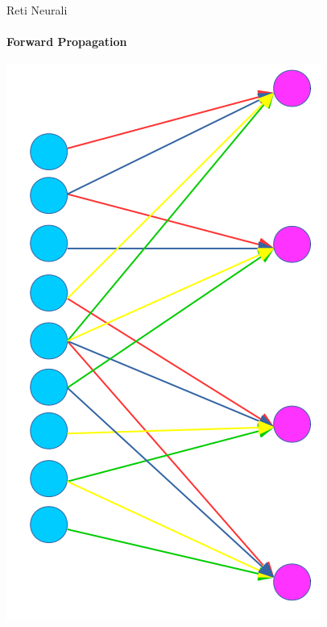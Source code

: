 \documentclass[
 ]{beamer}
\begin{document}
\begin{frame}{Reti Neurali}
    \framesubtitle{Forward Propagation} 
    
    \begin{center}
      \includegraphics[scale = 0.4]{fCNN1.png}
    \end{center}
    
\end{frame}
\end{document}
